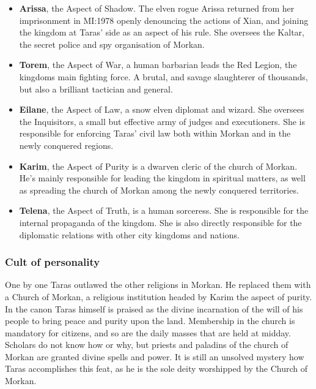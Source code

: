 \begin{itemize}[noitemsep]
  \item \textbf{Arissa}, the Aspect of Shadow. The elven rogue Arissa
    returned from her imprisonment in MI:1978 openly denouncing the
    actions of Xian, and joining the kingdom at Taras' side as an aspect of
    his rule. She oversees the Kaltar, the secret police and spy
    organisation of Morkan.

  \item \textbf{Torem}, the Aspect of War, a human barbarian leads the
    Red Legion, the kingdoms main fighting force. A brutal, and savage
    slaughterer of thousands, but also a brilliant tactician and general.

  \item \textbf{Eilane}, the Aspect of Law, a snow elven diplomat and
    wizard. She oversees the Inquisitors, a small but effective army of judges
    and executioners. She is responsible for enforcing Taras' civil law both
    within Morkan and in the newly conquered regions.

  \item \textbf{Karim}, the Aspect of Purity is a dwarven cleric of the
    church of Morkan. He's mainly responsible for leading the kingdom in
    spiritual matters, as well as spreading the church of Morkan among the
    newly conquered territories.

  \item \textbf{Telena}, the Aspect of Truth, is a human sorceress. She
    is responsible for the internal propaganda of the kingdom. She is also
    directly responsible for the diplomatic relations with other city kingdoms
    and nations.

\end{itemize}

\subsubsection{Cult of personality}

One by one Taras outlawed the other religions in Morkan. He replaced them with
a Church of Morkan, a religious institution headed by Karim the aspect of
purity. In the canon Taras himself is praised as the divine incarnation of the
will of his people to bring peace and purity upon the land. Membership in the
church is mandatory for citizens, and so are the daily masses that are held at
midday. Scholars do not know how or why, but priests and paladins of the
church of Morkan are granted divine spells and power. It is still an unsolved
mystery how Taras accomplishes this feat, as he is the sole deity worshipped
by the Church of Morkan.

